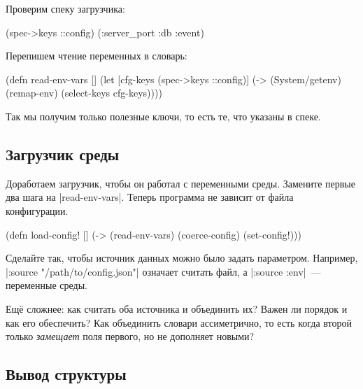 \noindent
Проверим спеку загрузчика:

\begin{english}
  \begin{clojure}
(spec->keys ::config)
(:server_port :db :event)
  \end{clojure}
\end{english}

\noindent
Перепишем чтение переменных в словарь:

\begin{english}
  \begin{clojure}
(defn read-env-vars []
  (let [cfg-keys (spec->keys ::config)]
    (-> (System/getenv)
        (remap-env)
        (select-keys cfg-keys))))
  \end{clojure}
\end{english}

\noindent
Так мы получим только полезные ключи, то есть те, что указаны в спеке.

\subsection{Загрузчик среды}

Доработаем загрузчик, чтобы он работал с переменными среды. Замените первые два
шага на \spverb|read-env-vars|. Теперь программа не зависит от файла
конфигурации.

\begin{english}
  \begin{clojure}
(defn load-config! []
  (-> (read-env-vars)
      (coerce-config)
      (set-config!)))
  \end{clojure}
\end{english}

Сделайте так, чтобы источник данных можно было задать параметром. Например,
\spverb|:source "/path/to/config.json"| означает считать файл, а
\spverb|:source :env|~--- переменные среды.


Ещ\"{е} сложнее: как считать оба источника и объединить их? Важен ли порядок и
как его обеспечить? Как объединить словари ассиметрично, то есть когда второй
только \emph{замещает} поля первого, но не дополняет новыми?

\subsection{Вывод структуры}


